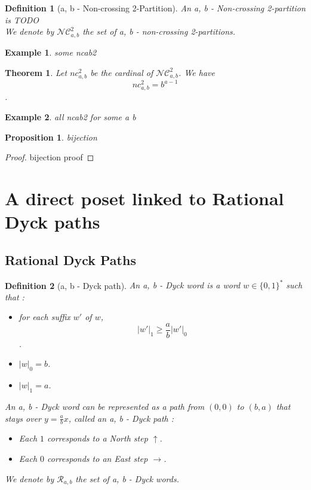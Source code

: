 \documentclass[12pt]{report}
\newtheorem{theorem}{Theorem}
\newtheorem*{prop}{Proposition}
\newtheorem{definition}{Definition}
\newtheorem*{example}{Example}
\begin{document}
\begin{definition}[a, b - Non-crossing 2-Partition]
    An \emph{a, b - Non-crossing 2-partition} is
    TODO\\
    We denote by $\mathcal{NC}^2_{a,b}$ the set of 
    a, b - non-crossing 2-partitions.
\end{definition}

\begin{example}
    some ncab2
\end{example}

\begin{theorem}
    Let $nc^2_{a,b}$ be the cardinal of $\mathcal{NC}^2_{a,b}$.
    We have $$nc^2_{a,b} = b^{a-1}$$.    
\end{theorem}

\begin{example}
    all ncab2 for some a b
\end{example}

\begin{prop}
    bijection
\end{prop}

\begin{proof}
    bijection proof
\end{proof}

\section{A direct poset linked to Rational Dyck paths}

\subsection{Rational Dyck Paths}

\begin{definition}[a, b - Dyck path]
    An \emph{a, b - Dyck word} is a word $w \in \{0,1\}^*$
    such that :
    \begin{itemize}
        \item for each \emph{suffix} $w'$ of $w$,
            $$|w'|_1 \geqslant \frac{a}{b}|w'|_0$$.
        \item $|w|_0 = b$.
        \item $|w|_1 = a$.
    \end{itemize}
    An a, b - Dyck word can be represented as a 
    \emph{path} from $(0,0)$ to $(b,a)$ that stays over
    $y = \frac{a}{b}x$, called an \emph{a, b - Dyck path} :
    \begin{itemize}
        \item Each $1$ corresponds to a \emph{North step}
        $\uparrow$. 
        \item Each $0$ corresponds to an \emph{East step}
        $\rightarrow$.
    \end{itemize}
    We denote by $\mathcal{R}_{a, b}$ the set of
    a, b - Dyck words.
\end{definition}
\end{document}
